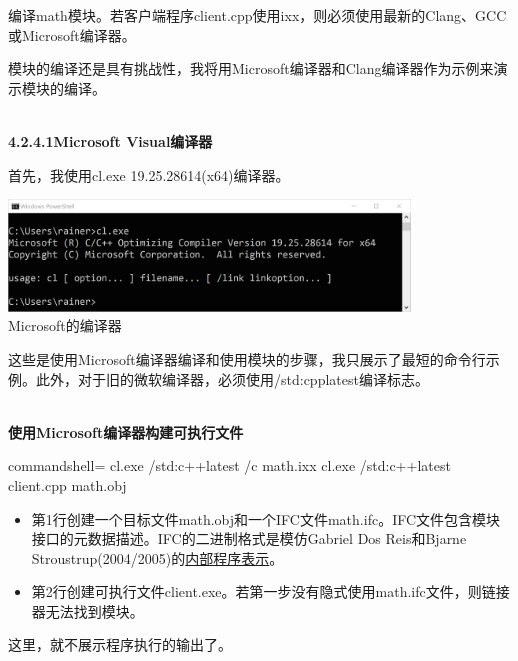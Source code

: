 
编译math模块。若客户端程序client.cpp使用ixx，则必须使用最新的Clang、GCC或Microsoft编译器。

模块的编译还是具有挑战性，我将用Microsoft编译器和Clang编译器作为示例来演示模块的编译。

\hspace*{\fill} \\ %
\noindent
\textbf{4.2.4.1\hspace{0.2cm}Microsoft Visual编译器}

首先，我使用cl.exe 19.25.28614(x64)编译器。

\begin{center}
\includegraphics[width=0.8\textwidth]{content/3/chapter4/images/18.png}\\
Microsoft的编译器
\end{center}

这些是使用Microsoft编译器编译和使用模块的步骤，我只展示了最短的命令行示例。此外，对于旧的微软编译器，必须使用/std:cpplatest编译标志。

\hspace*{\fill} \\ %
\noindent
\textbf{使用Microsoft编译器构建可执行文件}
\begin{tcblisting}{commandshell={}}
cl.exe /std:c++latest /c math.ixx
cl.exe /std:c++latest client.cpp math.obj
\end{tcblisting}

\begin{itemize}
\item 
第1行创建一个目标文件math.obj和一个IFC文件math.ifc。IFC文件包含模块接口的元数据描述。IFC的二进制格式是模仿Gabriel Dos Reis和Bjarne Stroustrup(2004/2005)的\href{https://www.stroustrup.com/gdr-bs-macis09.pdf}{内部程序表示}。

\item 
第2行创建可执行文件client.exe。若第一步没有隐式使用math.ifc文件，则链接器无法找到模块。
\end{itemize}

这里，就不展示程序执行的输出了。

